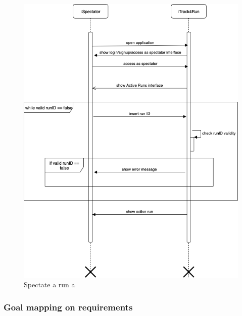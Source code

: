 \documentclass[titlepage]{article}
\begin{document}
\begin{figure}[H]
			\center
  			\includegraphics[width=\textwidth]{Diagrammi/sd8.png}
			\caption{Spectate a run a}
			\label{fig:sd8}
\end{figure}

									
			\subsubsection{Goal mapping on requirements}
			
\end{document}
